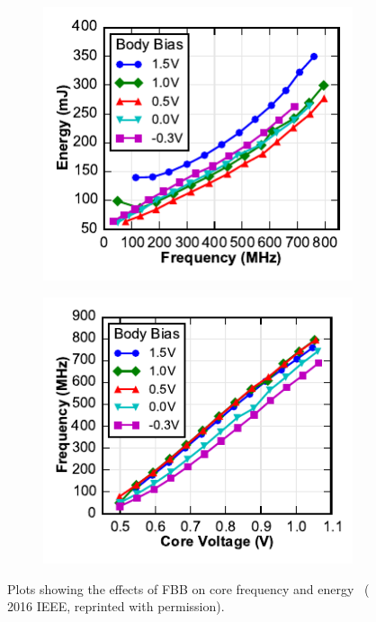 \documentclass[graybox]{svmult}
\begin{document}
\begin{figure}
  \centering
  \hspace*{\fill}
  \begin{subfigure}[t]{0.45\textwidth}
  \centering
  \includegraphics[width=\textwidth]{6-raven4-shmoo-a}
  \caption{}
  \label{fig:6-raven4-shmoo-a}
  \end{subfigure}
  \hspace*{\fill}
  \begin{subfigure}[t]{0.45\textwidth}
  \centering
  \includegraphics[width=\textwidth]{6-raven4-shmoo-b}
  \caption{}
  \label{fig:6-raven4-shmoo-b}
  \end{subfigure}
  \hspace*{\fill}
  \caption{Plots showing the effects of FBB on core frequency and energy~\cite{Keller2016} ({\textcopyright} 2016 IEEE, reprinted with permission).}
  \label{fig:6-raven4-shmoo}
\end{figure}
\end{document}
